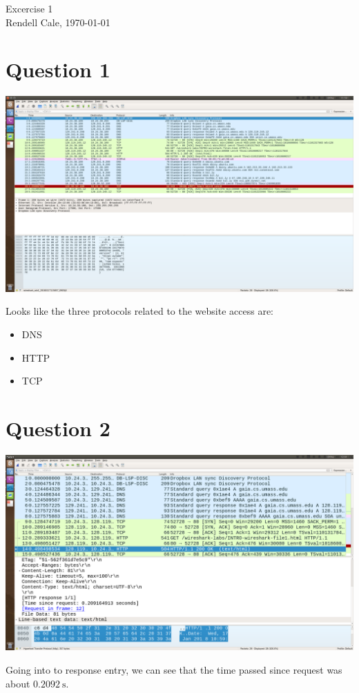 \documentclass{article}
\begin{document}
Excercise 1 \\
Rendell Cale, \today 

\section*{Question 1}
\begin{centering}
    \includegraphics[width=\linewidth]{wireshark-intro.png}
\end{centering}
Looks like the three protocols related to the website access are:
\begin{itemize}
   \item DNS
   \item HTTP
   \item TCP
\end{itemize}


\section*{Question 2}
\begin{centering}
    \includegraphics[width=\linewidth]{wireshark-intro-time.png}
\end{centering}
Going into to response entry, we can see that the time passed since request was about $\SI{0.2092}{\second}$. 
\end{document}
